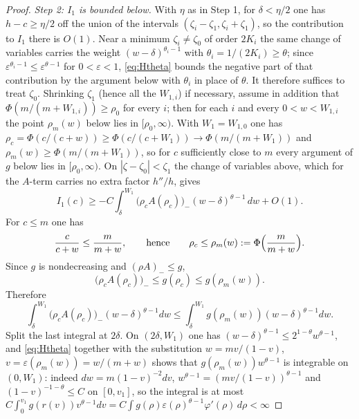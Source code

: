 \documentclass[11pt]{article}
\theoremstyle{definition}
\begin{document}
\begin{proof}
\emph{Step 2: $I_1$ is bounded below.}  With $\eta$ as in Step 1, for
$\delta<\eta/2$ one has $h-c\ge\eta/2$ off the union of the intervals
$(\zeta_i-\zeta_1,\zeta_i+\zeta_1)$, so the contribution to $I_1$ there is
$O(1)$.  Near a minimum $\zeta_i\ne\zeta_0$ of order $2K_i$ the same change of
variables carries the weight $(w-\delta)^{\theta_i-1}$ with
$\theta_i=1/(2K_i)\ge\theta$; since $\varepsilon^{\theta_i-1}\le
\varepsilon^{\theta-1}$ for $0<\varepsilon<1$, \eqref{eq:Htheta} bounds the
negative part of that contribution by the argument below with $\theta_i$ in
place of $\theta$.  It therefore suffices to treat $\zeta_0$.  Shrinking
$\zeta_1$ (hence all the $W_{1,i}$) if necessary, assume in addition that
$\Phi(m/(m+W_{1,i}))\ge\rho_0$ for every $i$; then for each $i$ and every
$0<w<W_{1,i}$ the point $\rho_m(w)$ below lies in $[\rho_0,\infty)$.  With
$W_1=W_{1,0}$ one has
$\rho_c=\Phi(c/(c+w))\ge\Phi(c/(c+W_1))\to\Phi(m/(m+W_1))$ and
$\rho_m(w)\ge\Phi(m/(m+W_1))$, so for $c$ sufficiently close to $m$ every
argument of $g$ below lies in $[\rho_0,\infty)$.  On
$|\zeta-\zeta_0|<\zeta_1$ the change of variables above, which for the
$A$-term carries no extra factor $h''/h$, gives
\begin{equation}
I_1(c)\ge -C\int_\delta^{W_1}
\bigl(\rho_c A(\rho_c)\bigr)_- (w-\delta)^{\theta-1}\,dw+O(1).
\end{equation}
For $c\le m$ one has
\begin{equation}
\frac{c}{c+w}\le\frac{m}{m+w},
\qquad\text{hence}\qquad
\rho_c\le \rho_m(w):=\Phi\Bigl(\frac{m}{m+w}\Bigr).
\end{equation}
Since $g$ is nondecreasing and $(\rho A)_-\le g$,
\begin{equation}
\bigl(\rho_c A(\rho_c)\bigr)_-\le g(\rho_c)\le g(\rho_m(w)).
\end{equation}
Therefore
\begin{equation}
\int_\delta^{W_1}\bigl(\rho_c A(\rho_c)\bigr)_-(w-\delta)^{\theta-1}dw
\le\int_\delta^{W_1}g(\rho_m(w))(w-\delta)^{\theta-1}dw .
\end{equation}
Split the last integral at $2\delta$.  On $(2\delta,W_1)$ one has
$(w-\delta)^{\theta-1}\le2^{1-\theta}w^{\theta-1}$, and
\eqref{eq:Htheta} together with the substitution $w=mv/(1-v)$,
$v=\varepsilon(\rho_m(w))=w/(m+w)$ shows that $g(\rho_m(w))w^{\theta-1}$ is
integrable on $(0,W_1)$: indeed $dw=m(1-v)^{-2}dv$,
$w^{\theta-1}=(mv/(1-v))^{\theta-1}$ and $(1-v)^{-1-\theta}\le C$ on
$[0,v_1]$, so the integral is at most
$C\int_0^{v_1}g(r(v))v^{\theta-1}dv
=C\int g(\rho)\varepsilon(\rho)^{\theta-1}\varphi'(\rho)\,d\rho<\infty$

\end{proof}
\end{document}
